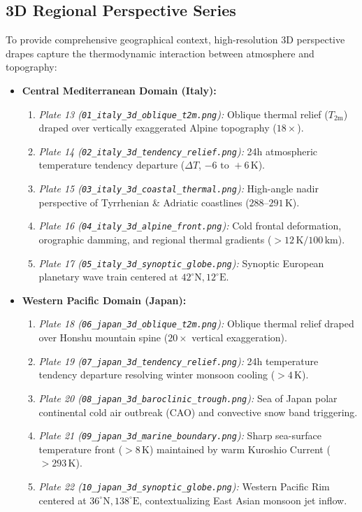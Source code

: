 \documentclass[10pt,twocolumn,letterpaper]{article}
\begin{document}
\subsection{3D Regional Perspective Series}
To provide comprehensive geographical context, high-resolution 3D perspective drapes capture the thermodynamic interaction between atmosphere and topography:
\begin{itemize}
    \item \textbf{Central Mediterranean Domain (Italy):}
    \begin{enumerate}
        \item \emph{Plate 13 (\nolinkurl{01_italy_3d_oblique_t2m.png}):} Oblique thermal relief ($T_{2\text{m}}$) draped over vertically exaggerated Alpine topography ($18\times$).
        \item \emph{Plate 14 (\nolinkurl{02_italy_3d_tendency_relief.png}):} 24h atmospheric temperature tendency departure ($\Delta T$, $-6\text{ to }+6\,\text{K}$).
        \item \emph{Plate 15 (\nolinkurl{03_italy_3d_coastal_thermal.png}):} High-angle nadir perspective of Tyrrhenian \& Adriatic coastlines ($288\text{--}291\,\text{K}$).
        \item \emph{Plate 16 (\nolinkurl{04_italy_3d_alpine_front.png}):} Cold frontal deformation, orographic damming, and regional thermal gradients ($>12\,\text{K}/100\,\text{km}$).
        \item \emph{Plate 17 (\nolinkurl{05_italy_3d_synoptic_globe.png}):} Synoptic European planetary wave train centered at $42^\circ\text{N}, 12^\circ\text{E}$.
    \end{enumerate}
    \item \textbf{Western Pacific Domain (Japan):}
    \begin{enumerate}
        \item \emph{Plate 18 (\nolinkurl{06_japan_3d_oblique_t2m.png}):} Oblique thermal relief draped over Honshu mountain spine ($20\times$ vertical exaggeration).
        \item \emph{Plate 19 (\nolinkurl{07_japan_3d_tendency_relief.png}):} 24h temperature tendency departure resolving winter monsoon cooling ($>4\,\text{K}$).
        \item \emph{Plate 20 (\nolinkurl{08_japan_3d_baroclinic_trough.png}):} Sea of Japan polar continental cold air outbreak (CAO) and convective snow band triggering.
        \item \emph{Plate 21 (\nolinkurl{09_japan_3d_marine_boundary.png}):} Sharp sea-surface temperature front ($>8\,\text{K}$) maintained by warm Kuroshio Current ($>293\,\text{K}$).
        \item \emph{Plate 22 (\nolinkurl{10_japan_3d_synoptic_globe.png}):} Western Pacific Rim centered at $36^\circ\text{N}, 138^\circ\text{E}$, contextualizing East Asian monsoon jet inflow.
    \end{enumerate}
\end{itemize}
\end{document}

